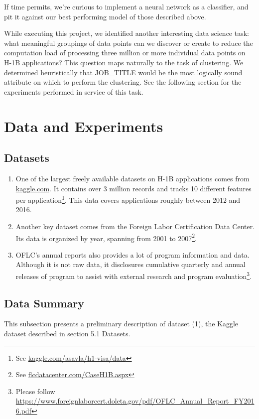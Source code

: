 \documentclass[sigconf]{acmart}
\begin{document}
If time permits, we're curious to implement a neural network as a classifier, and pit it
against our best performing model of those described above.

While executing this project, we identified another interesting data science task: what meaningful
groupings of data points can we discover or create to reduce the computation load of processing
three million or more individual data points on H-1B applications? This question maps naturally to
the task of clustering. We determined heuristically that JOB\_TITLE would be the most logically
sound attribute on which to perform the clustering. See the following section for the experiments
performed in service of this task.


\section{Data and Experiments}

\subsection{Datasets}
\begin{enumerate}
\item One of the largest freely available datasets on H-1B applications comes from
\href{https://kaggle.com}{kaggle.com}. It contains over 3 million records and tracks 10 different features
per application\footnote{See \href{https://www.kaggle.com/asavla/h1-visa/data}{kaggle.com/asavla/h1-visa/data}}.
This data covers applications roughly between 2012 and 2016.

\item Another key dataset comes from the Foreign Labor Certification Data Center. Its data is
organized by year, spanning from 2001 to 2007\footnote{See
\href{http://www.flcdatacenter.com/CaseH1B.aspx}{flcdatacenter.com/CaseH1B.aspx}}.

\item OFLC's annual reports also provides a lot of program information and data. Although
it is not raw data, it disclosures cumulative quarterly and annual releases of program to assist
with external research and program evaluation\footnote{Please follow
\href{https://www.foreignlaborcert.doleta.gov/pdf/OFLC_Annual_Report_FY2016.pdf}{https://www.foreignlaborcert.doleta.gov/pdf/OFLC\_Annual\_Report\_FY2016.pdf}}.
\end{enumerate}


\subsection{Data Summary}
This subsection presents a preliminary description of dataset (1), the Kaggle dataset described in
section 5.1 Datasets.
\end{document}
